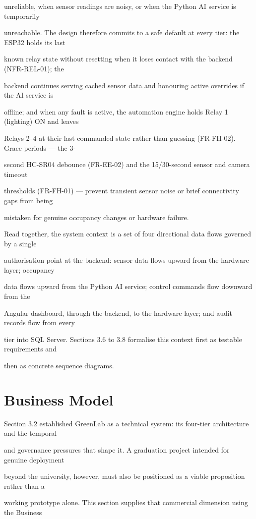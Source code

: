 unreliable, when sensor readings are noisy, or when the Python AI service is temporarily

unreachable. The design therefore commits to a safe default at every tier: the ESP32 holds its last

known relay state without resetting when it loses contact with the backend (NFR-REL-01); the

backend continues serving cached sensor data and honouring active overrides if the AI service is

offline; and when any fault is active, the automation engine holds Relay 1 (lighting) ON and leaves

Relays 2--4 at their last commanded state rather than guessing (FR-FH-02). Grace periods --- the 3-

second HC-SR04 debounce (FR-EE-02) and the 15/30-second sensor and camera timeout

thresholds (FR-FH-01) --- prevent transient sensor noise or brief connectivity gaps from being

mistaken for genuine occupancy changes or hardware failure.

Read together, the system context is a set of four directional data flows governed by a single

authorisation point at the backend: sensor data flows upward from the hardware layer; occupancy

data flows upward from the Python AI service; control commands flow downward from the

Angular dashboard, through the backend, to the hardware layer; and audit records flow from every

tier into SQL Server. Sections 3.6 to 3.8 formalise this context first as testable requirements and

then as concrete sequence diagrams.


\section{Business Model}
Section 3.2 established GreenLab as a technical system: its four-tier architecture and the temporal

and governance pressures that shape it. A graduation project intended for genuine deployment

beyond the university, however, must also be positioned as a viable proposition rather than a

working prototype alone. This section supplies that commercial dimension using the Business

